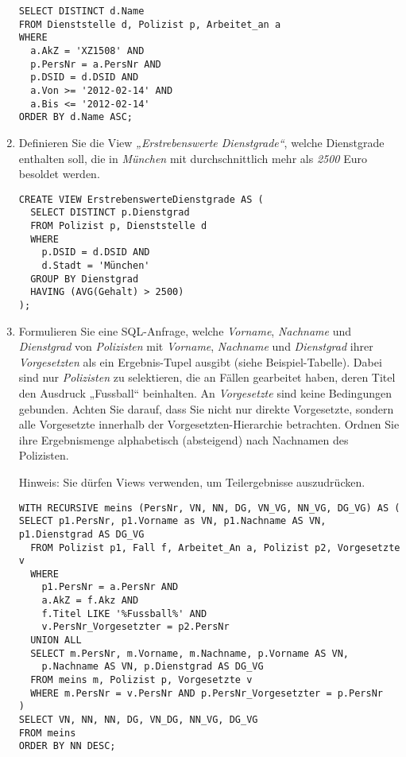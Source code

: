 \documentclass{lehramt-informatik-aufgabe}
\begin{document}
\begin{enumerate}
\begin{liAntwort}
\begin{verbatim}
SELECT DISTINCT d.Name
FROM Dienststelle d, Polizist p, Arbeitet_an a
WHERE
  a.AkZ = 'XZ1508' AND
  p.PersNr = a.PersNr AND
  p.DSID = d.DSID AND
  a.Von >= '2012-02-14' AND
  a.Bis <= '2012-02-14'
ORDER BY d.Name ASC;
\end{verbatim}
\end{liAntwort}


\item Definieren Sie die View \emph{„Erstrebenswerte Dienstgrade“},
welche Dienstgrade enthalten soll, die in \emph{München} mit
durchschnittlich mehr als \emph{2500} Euro besoldet werden.

\begin{liAntwort}
\begin{verbatim}
CREATE VIEW ErstrebenswerteDienstgrade AS (
  SELECT DISTINCT p.Dienstgrad
  FROM Polizist p, Dienststelle d
  WHERE
    p.DSID = d.DSID AND
    d.Stadt = 'München'
  GROUP BY Dienstgrad
  HAVING (AVG(Gehalt) > 2500)
);
\end{verbatim}
\end{liAntwort}


\item Formulieren Sie eine SQL-Anfrage, welche \emph{Vorname},
\emph{Nachname} und \emph{Dienstgrad} von \emph{Polizisten} mit
\emph{Vorname}, \emph{Nachname} und \emph{Dienstgrad} ihrer
\emph{Vorgesetzten} als ein Ergebnis-Tupel ausgibt (siehe
Beispiel-Tabelle). Dabei sind nur \emph{Polizisten} zu selektieren, die
an Fällen gearbeitet haben, deren Titel den Ausdruck „Fussball“
beinhalten. An \emph{Vorgesetzte} sind keine Bedingungen gebunden.
Achten Sie darauf, dass Sie nicht nur direkte Vorgesetzte, sondern alle
Vorgesetzte innerhalb der Vorgesetzten-Hierarchie betrachten. Ordnen Sie
ihre Ergebnismenge alphabetisch (absteigend) nach Nachnamen des
Polizisten.

Hinweis: Sie dürfen Views verwenden, um Teilergebnisse auszudrücken.

\begin{liAntwort}

\begin{verbatim}
WITH RECURSIVE meins (PersNr, VN, NN, DG, VN_VG, NN_VG, DG_VG) AS (
SELECT p1.PersNr, p1.Vorname as VN, p1.Nachname AS VN, p1.Dienstgrad AS DG_VG
  FROM Polizist p1, Fall f, Arbeitet_An a, Polizist p2, Vorgesetzte v
  WHERE
    p1.PersNr = a.PersNr AND
    a.AkZ = f.Akz AND
    f.Titel LIKE '%Fussball%' AND
    v.PersNr_Vorgesetzter = p2.PersNr
  UNION ALL
  SELECT m.PersNr, m.Vorname, m.Nachname, p.Vorname AS VN,
    p.Nachname AS VN, p.Dienstgrad AS DG_VG
  FROM meins m, Polizist p, Vorgesetzte v
  WHERE m.PersNr = v.PersNr AND p.PersNr_Vorgesetzter = p.PersNr
)
SELECT VN, NN, NN, DG, VN_DG, NN_VG, DG_VG
FROM meins
ORDER BY NN DESC;
\end{verbatim}
\end{liAntwort}
\end{enumerate}
\end{document}

